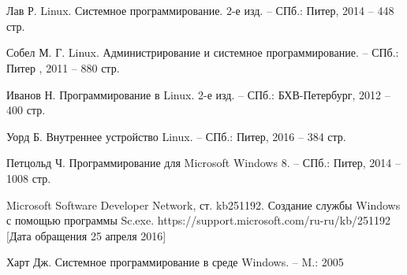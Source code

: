 \newpage
\section*{}

\begin{thebibliography}{00}

Лав Р. Linux. Системное программирование. 2-е изд. -- СПб.: Питер, 2014 -- 448 стр.

Собел М. Г. Linux. Администрирование и системное программирование. -- СПб.:  Питер , 2011 -- 880 стр.

Иванов Н. Программирование в Linux. 2-е изд. -- СПб.:  БХВ-Петербург, 2012 -- 400 стр.

Уорд Б. Внутреннее устройство Linux. -- СПб.:  Питер, 2016 -- 384 стр.

Петцольд Ч. Программирование для Microsoft Windows 8. -- СПб.:  Питер, 2014 -- 1008 стр.

Microsoft Software Developer Network, ст. kb251192. Создание службы Windows с помощью программы Sc.exe. https://support.microsoft.com/ru-ru/kb/251192 [Дата обращения 25 апреля 2016]

Харт Дж. Системное программирование в среде Windows. -- M.: 2005


\end{thebibliography}